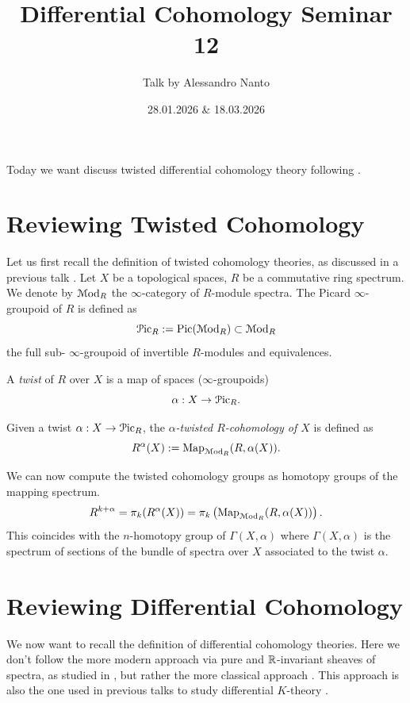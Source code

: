 \documentclass[10pt]{amsart}
\title{Differential Cohomology Seminar 12}
\date{28.01.2026 \& 18.03.2026}
\author{Talk by Alessandro Nanto}
\begin{document}
\maketitle

Today we want discuss twisted differential cohomology theory following \cite{bunkegepner2021diffktheory}.

\section{Reviewing Twisted Cohomology}
Let us first recall the definition of twisted cohomology theories, as discussed in a previous talk \cite{berkenhagen2025diffcoh8}. Let $X$ be a topological spaces, $R$ be a commutative ring spectrum. We denote by $\mathcal{M}\mathrm{od}_R$ the $\infty$-category of $R$-module spectra. The Picard $\infty$-groupoid of $R$ is defined as 
\[\mathcal{P}\mathrm{ic}_R := \mathrm{Pic}(\mathcal{M}\mathrm{od}_R) \subset \mathcal{M}\mathrm{od}_R\]
the full sub- $\infty$-groupoid of invertible $R$-modules and equivalences.

\begin{definition}
A \emph{twist} of $R$ over $X$ is a map of spaces ($\infty$-groupoids)
\[\alpha : X \to \mathcal{P}\mathrm{ic}_R.\]
\end{definition}

\begin{definition}
Given a twist $\alpha : X \to \mathcal{P}\mathrm{ic}_R$, the \emph{$\alpha$-twisted $R$-cohomology of $X$} is defined as
\[R^\alpha(X) := \mathrm{Map}_{\mathcal{M}\mathrm{od}_R}(R, \alpha(X)).\]
\end{definition}

We can now compute the twisted cohomology groups as homotopy groups of the mapping spectrum.
\[R^{k + \alpha} = \pi_k(R^\alpha(X)) = \pi_k\left(\mathrm{Map}_{\mathcal{M}\mathrm{od}_R}(R, \alpha(X))\right).\]
This coincides with the $n$-homotopy group of $\Gamma(X, \alpha)$ where $\Gamma(X, \alpha)$ is the spectrum of sections of the bundle of spectra over $X$ associated to the twist $\alpha$.

\section{Reviewing Differential Cohomology}
We now want to recall the definition of differential cohomology theories. Here we don't follow the more modern approach via pure and $\mathbb{R}$-invariant sheaves of spectra, as studied in \cite{bunkenikolausvoelkl2016diffcoh}, but rather the more classical approach \cite{hopkinssinger2005diffcoh}. This approach is also the one used in previous talks to study differential $K$-theory \cite{ludewig2025diffcoh7}.
\end{document}
